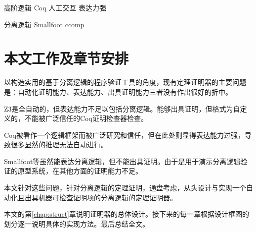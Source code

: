 高阶逻辑 Coq 人工交互 表达力强

分离逻辑 Smallfoot ccomp

\section{本文工作及章节安排}
以构造实用的基于分离逻辑的程序验证工具的角度，现有定理证明器的主要问题是：自动化证明能力、表达能力、出具证明能力三者没有作出很好的折中。

Z3是全自动的，但表达能力不足以包括分离逻辑。能够出具证明，但格式为自定义的，不能被广泛信任的Coq证明检查器检查。

Coq被看作一个逻辑框架而被广泛研究和信任，但在此处则显得表达能力过强，导致很多显然的推理无法自动进行。

Smallfoot等虽然能表达分离逻辑，但不能出具证明。由于是用于演示分离逻辑验证的原型系统，在其他方面的证明能力不足。

本文针对这些问题，针对分离逻辑的定理证明，通盘考虑，从头设计与实现一个自动化且出具机器可检查证明项的分离逻辑的定理证明器。

本文的第\ref{chap:struct}章说明证明器的总体设计。接下来的每一章根据设计框图的划分逐一说明具体的实现方法。最后总结全文。

